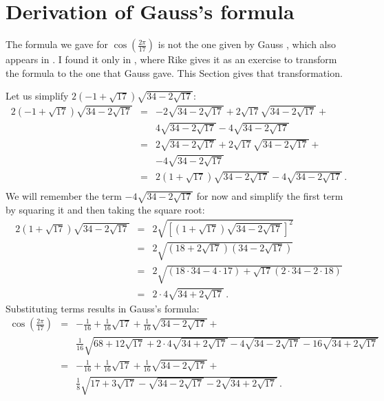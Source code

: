 \documentclass[11pt,a4paper]{article}
\newenvironment{form}[1]{%
\begin{displaymath}%
\renewcommand{\arraystretch}{#1}%
\begin{array}{lcl}}%
{\end{array}%
\end{displaymath}%
}
\newcommand*{\disfrac}[2]{\displaystyle\frac{#1}{#2}}
\begin{document}
\clearpage

\section{Derivation of Gauss's formula}\label{s.derivation}

The formula we gave for $\cos\left(\disfrac{2\pi}{17}\right)$ is not the one given by Gauss \cite[p.~458]{gauss}, which also appears in \cite[p.~68]{jorg}. I found it only in \cite{rike}, where Rike gives it as an exercise to transform the formula to the one that Gauss gave. This Section gives that transformation.

Let us simplify $2(-1+\sqrt{17})\sqrt{34-2\sqrt{17}}$:
\begin{form}{1.7}
2(-1+\sqrt{17})\sqrt{34-2\sqrt{17}} &=&
-2\sqrt{34-2\sqrt{17}} +2\sqrt{17}\sqrt{34-2\sqrt{17}}+\\
&&4\sqrt{34-2\sqrt{17}}-4\sqrt{34-2\sqrt{17}}\\
&=&
2\sqrt{34-2\sqrt{17}} +2\sqrt{17}\sqrt{34-2\sqrt{17}}+\\
&&-4\sqrt{34-2\sqrt{17}}\\
&=&2(1+\sqrt{17})\sqrt{34-2\sqrt{17}}-4\sqrt{34-2\sqrt{17}}\,.\\
\end{form}
We will remember the term $-4\sqrt{34-2\sqrt{17}}$ for now and simplify the first term by squaring it and then taking the square root:
\begin{form}{1.8}
2(1+\sqrt{17})\sqrt{34-2\sqrt{17}}&=&
2\sqrt{\left[(1+\sqrt{17})\sqrt{34-2\sqrt{17}}\right]^2}\\
&=&2\sqrt{(18+2\sqrt{17})(34-2\sqrt{17})}\\
&=&2\sqrt{(18\cdot 34-4\cdot17)+\sqrt{17}(2\cdot 34 - 2\cdot 18)}\\
&=&2\cdot 4\sqrt{34+2\sqrt{17}}\,.
\end{form}
Substituting terms results in Gauss's formula:
\begin{form}{2.2}
\cos\left(\disfrac{2\pi}{17}\right) &=& 
-\disfrac{1}{16}+\disfrac{1}{16}\sqrt{17} + 
     \disfrac{1}{16}\sqrt{34-2\sqrt{17}}
    + \\
    &&
     \disfrac{1}{16}\sqrt{
     68+12\sqrt{17} + 
     2\cdot 4\sqrt{34+2\sqrt{17}}-4\sqrt{34-2\sqrt{17}}
   -16
     \sqrt{34+2\sqrt{17}}
   }\\
&=&-\disfrac{1}{16}+\frac{1}{16}\sqrt{17} + 
     \disfrac{1}{16}\sqrt{34-2\sqrt{17}}
    + \\
    &&
     \disfrac{1}{8}\sqrt{
     17+3\sqrt{17} - 
     \sqrt{34-2\sqrt{17}}
   -2
     \sqrt{34+2\sqrt{17}}
   }\,.
\end{form}
\end{document}
